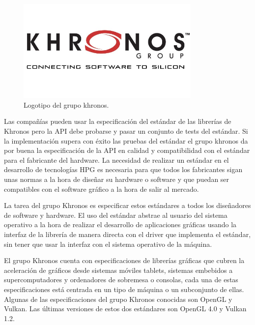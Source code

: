 \documentclass[a4paper, 17pt]{book}
\begin{document}
\begin{figure}[H]
    \centering
    \includegraphics[width=9cm, keepaspectratio]{img/khronos.jpg}
    \caption{Logotipo del grupo khronos.}
    \label{figura:khronos}
\end{figure}

Las compañías pueden usar la especificación del estándar de las librerías de Khronos pero la API debe probarse y pasar un
conjunto de tests del estándar. Si la implementación supera con éxito las pruebas del estándar el grupo khronos da por
buena la especificación de la API en calidad y compatibilidad con el estándar para el fabricante del hardware.
La necesidad de realizar un estándar en el desarrollo de tecnologías HPG es necesaria para que todos los fabricantes
sigan unas normas a la hora de diseñar su hardware o software y que puedan ser compatibles con el software gráfico a la
hora de salir al mercado. 

\vspace{1mm} %

La tarea del grupo Khronos es especificar estos estándares a todos los diseñadores de software y hardware. El uso del
estándar abstrae al usuario del sistema operativo a la hora de realizar el desarrollo de aplicaciones gráficas usando
la interfaz de la librería de manera directa con el driver que implementa el estándar, sin tener que usar la interfaz
con el sistema operativo de la máquina. 

\vspace{1mm} %

El grupo Khronos cuenta con especificaciones de librerías gráficas que cubren la aceleración de gráficos desde sistemas
móviles tablets, sistemas embebidos a supercomputadores y ordenadores de sobremesa o consolas, cada una de estas
especificaciones está centrada en un tipo de máquina o un subconjunto de ellas. Algunas de las especificaciones del grupo
Khronos conocidas son OpenGL y Vulkan. Las últimas versiones de estos dos estándares son OpenGL 4.0 y Vulkan 1.2. 
\end{document}
